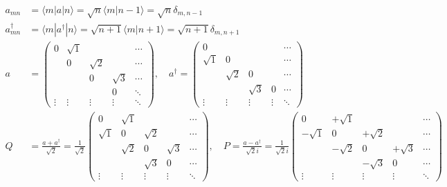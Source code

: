 \documentclass[../../main.tex]{subfiles}
\begin{document}
\begin{align*}
    a_{mn} &= \langle m|a|n\rangle = \sqrt{n}\langle m|n-1\rangle = \sqrt{n}\delta_{m,n-1}\\
    a^{\dagger}_{mn} &= \langle m|a^{\dagger}|n\rangle = \sqrt{n+1}\langle m|n+1\rangle = \sqrt{n+1}\delta_{m,n+1}\\
    a &= \begin{pmatrix}
        0&\sqrt{1}& & &\cdots\\
         &0&\sqrt{2}& &\cdots\\
         & &0&\sqrt{3}&\cdots\\
         & & & 0&\ddots\\
        \vdots&\vdots&\vdots&\vdots&\ddots
    \end{pmatrix},\quad a^{\dagger} = \begin{pmatrix}
        0& & & &\cdots\\
        \sqrt{1}&0& & &\cdots\\
         &\sqrt{2}&0& &\cdots\\
         & &\sqrt{3}&0&\cdots\\
        \vdots&\vdots&\vdots&\vdots&\ddots
    \end{pmatrix}\\
    Q &= \frac{a + a^{\dagger}}{\sqrt{2}} = \frac{1}{\sqrt{2}}\begin{pmatrix}
        0&\sqrt{1}& & &\cdots\\
        \sqrt{1}&0&\sqrt{2}& &\cdots\\
         &\sqrt{2}&0&\sqrt{3}&\cdots\\
         & &\sqrt{3}&0&\cdots\\
        \vdots&\vdots&\vdots&\vdots&\ddots
    \end{pmatrix},\quad P = \frac{a - a^{\dagger}}{\sqrt{2}i} = \frac{1}{\sqrt{2}i}\begin{pmatrix}
        0&+\sqrt{1}& & &\cdots\\
        -\sqrt{1}&0&+\sqrt{2}& &\cdots\\
         &-\sqrt{2}&0&+\sqrt{3}&\cdots\\
         & &-\sqrt{3}&0&\cdots\\
        \vdots&\vdots&\vdots&\vdots&\ddots
    \end{pmatrix}
\end{align*}
\end{document}
